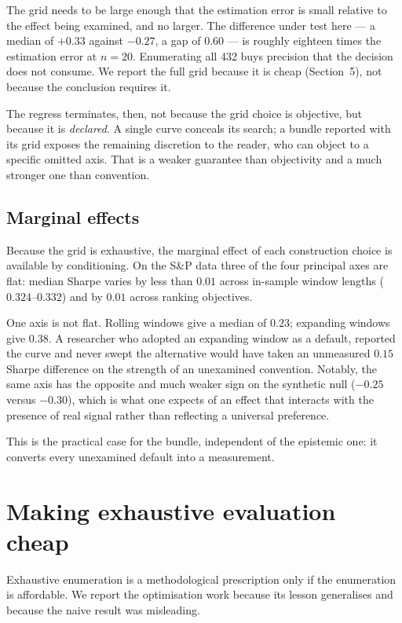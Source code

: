 \documentclass[11pt,a4paper]{article}
\begin{document}
The grid needs to be large enough that the estimation error is small relative
to the effect being examined, and no larger. The difference under test here ---
a median of $+0.33$ against $-0.27$, a gap of $0.60$ --- is roughly eighteen
times the estimation error at $n = 20$. Enumerating all 432 buys precision that
the decision does not consume. We report the full grid because it is cheap
(Section~5), not because the conclusion requires it.

The regress terminates, then, not because the grid choice is objective, but
because it is \emph{declared}. A single curve conceals its search; a bundle
reported with its grid exposes the remaining discretion to the reader, who can
object to a specific omitted axis. That is a weaker guarantee than objectivity
and a much stronger one than convention.

\subsection{Marginal effects}

Because the grid is exhaustive, the marginal effect of each construction choice
is available by conditioning. On the S\&P data three of the four principal axes
are flat: median Sharpe varies by less than $0.01$ across in-sample window
lengths ($0.324$--$0.332$) and by $0.01$ across ranking objectives.

One axis is not flat. Rolling windows give a median of $0.23$; expanding windows
give $0.38$. A researcher who adopted an expanding window as a default, reported
the curve and never swept the alternative would have taken an unmeasured $0.15$
Sharpe difference on the strength of an unexamined convention. Notably, the same
axis has the opposite and much weaker sign on the synthetic null ($-0.25$ versus
$-0.30$), which is what one expects of an effect that interacts with the
presence of real signal rather than reflecting a universal preference.

This is the practical case for the bundle, independent of the epistemic one: it
converts every unexamined default into a measurement.

\section{Making exhaustive evaluation cheap}

Exhaustive enumeration is a methodological prescription only if the enumeration
is affordable. We report the optimisation work because its lesson generalises
and because the naive result was misleading.
\end{document}

